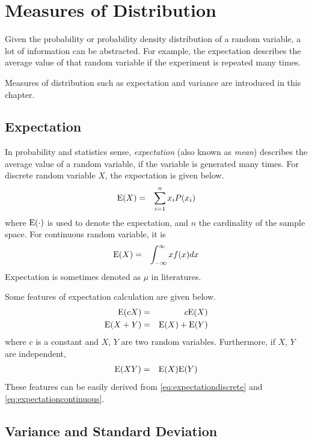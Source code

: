 \chapter{Measures of Distribution} \label{ch:measuresdistribution}

Given the probability or probability density distribution of a random variable, a lot of information can be abstracted. For example, the expectation describes the average value of that random variable if the experiment is repeated many times.

Measures of distribution such as expectation and variance are introduced in this chapter.

\section{Expectation}

In probability and statistics sense, \textit{expectation} (also known as \textit{mean}) describes the average value of a random variable, if the variable is generated many times. For discrete random variable $X$, the expectation is given below.
\begin{eqnarray}
  \textup{E}(X) &=& \sum_{i=1}^{n}x_iP(x_i) \label{eq:expectationdiscrete}
\end{eqnarray}
where $\textup{E}(\cdot)$ is used to denote the expectation, and $n$ the cardinality of the sample space. For continuous random variable, it is
\begin{eqnarray}
  \textup{E}(X) &=& \int_{-\infty}^{\infty}xf(x)dx \label{eq:expectationcontinuous}
\end{eqnarray}
Expectation is sometimes denoted as $\mu$ in literatures.

Some features of expectation calculation are given below.
\begin{eqnarray}
  \textup{E}(cX) &=& c\textup{E}(X) \nonumber \\
  \textup{E}(X+Y) &=& \textup{E}(X) + \textup{E}(Y) \nonumber
\end{eqnarray}
where $c$ is a constant and $X$, $Y$ are two random variables. Furthermore, if $X$, $Y$ are independent,
\begin{eqnarray}
  \textup{E}(XY) &=& \textup{E}(X)\textup{E}(Y) \nonumber
\end{eqnarray}
These features can be easily derived from \eqref{eq:expectationdiscrete} and \eqref{eq:expectationcontinuous}.

\section{Variance and Standard Deviation}

